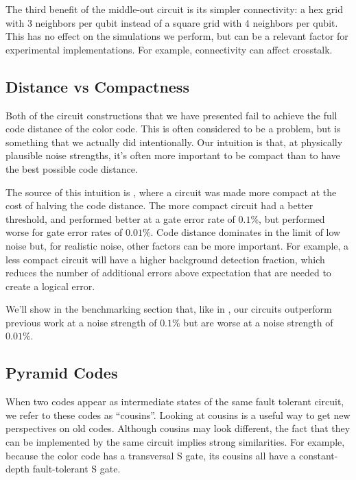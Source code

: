 \documentclass[onecolumn,unpublished,a4paper]{quantumarticle}
\theoremstyle{definition}
\theoremstyle{definition}
\theoremstyle{definition}
\begin{document}
The third benefit of the middle-out circuit is its simpler connectivity: a hex grid with 3 neighbors per qubit instead of a square grid with 4 neighbors per qubit.
This has no effect on the simulations we perform, but can be a relevant factor for experimental implementations.
For example, connectivity can affect crosstalk.

\subsection{Distance vs Compactness}
\label{sec:circuits-distance}

Both of the circuit constructions that we have presented fail to achieve the full code distance of the color code.
This is often considered to be a problem, but is something that we actually did intentionally.
Our intuition is that, at physically plausible noise strengths, it's often more important to be compact than to have the best possible code distance.

The source of this intuition is \cite{gidney2022pentagonsurfacecode}, where a circuit was made more compact at the cost of halving the code distance.
The more compact circuit had a better threshold, and performed better at a gate error rate of $0.1\%$, but performed worse for gate error rates of $0.01\%$.
Code distance dominates in the limit of low noise but, for realistic noise, other factors can be more important.
For example, a less compact circuit will have a higher background detection fraction, which reduces the number of additional errors above expectation that are needed to create a logical error.

We'll show in the benchmarking section that, like in \cite{gidney2022pentagonsurfacecode}, our circuits outperform previous work at a noise strength of $0.1\%$ but are worse at a noise strength of $0.01\%$.


\subsection{Pyramid Codes}
\label{sec:circuits-pyramid}

When two codes appear as intermediate states of the same fault tolerant circuit, we refer to these codes as ``cousins''.
Looking at cousins is a useful way to get new perspectives on old codes.
Although cousins may look different, the fact that they can be implemented by the same circuit implies strong similarities.
For example, because the color code has a transversal S gate, its cousins all have a constant-depth fault-tolerant S gate.
\end{document}
